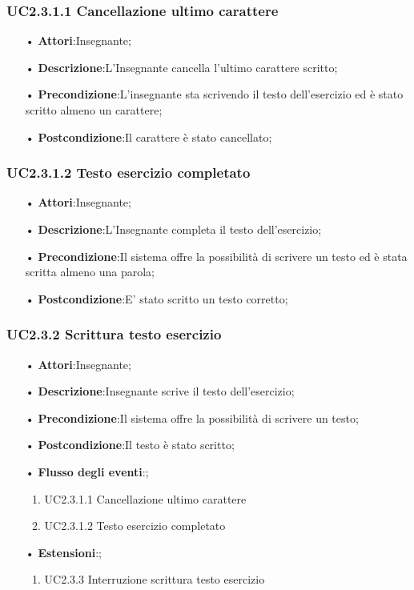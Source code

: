 \subsubsection{UC2.3.1.1 Cancellazione ultimo carattere}
\begin{itemize}
	\item[•] \textbf{Attori}:Insegnante;
	\item[•] \textbf{Descrizione}:L’Insegnante cancella l'ultimo carattere scritto;
	\item[•] \textbf{Precondizione}:L’insegnante sta scrivendo il testo dell’esercizio ed è stato scritto
almeno un carattere;

	\item[•] \textbf{Postcondizione}:Il carattere è stato cancellato;
\end{itemize}

\subsubsection{UC2.3.1.2 Testo esercizio completato}
\begin{itemize}
	\item[•] \textbf{Attori}:Insegnante;
	\item[•] \textbf{Descrizione}:L’Insegnante completa il testo dell’esercizio;
	\item[•] \textbf{Precondizione}:Il sistema offre la possibilità di scrivere un testo ed è stata scritta almeno una parola;
	\item[•] \textbf{Postcondizione}:E’ stato scritto un testo corretto;
\end{itemize}


\subsubsection{UC2.3.2 Scrittura testo esercizio}
\begin{itemize}
	\item[•] \textbf{Attori}:Insegnante;
	\item[•] \textbf{Descrizione}:Insegnante scrive il testo dell’esercizio;
	\item[•] \textbf{Precondizione}:Il sistema offre la possibilità di scrivere un testo;
	\item[•] \textbf{Postcondizione}:Il testo è stato scritto;
	\item[•] \textbf{Flusso degli eventi}:;
	\begin{enumerate}
		\item UC2.3.1.1	Cancellazione ultimo carattere
		\item UC2.3.1.2	Testo esercizio completato
	\end{enumerate}
	\item[•] \textbf{Estensioni}:;	
	\begin{enumerate}
		\item UC2.3.3 Interruzione scrittura testo esercizio
	\end{enumerate}
\end{itemize}



